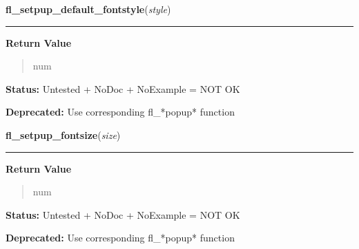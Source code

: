     \label{xformslib:deprecated:fl_setpup_default_fontstyle}

    \vspace{0.5ex}

\hspace{.8\funcindent}\begin{boxedminipage}{\funcwidth}

    \raggedright \textbf{fl\_setpup\_default\_fontstyle}(\textit{style})

    \vspace{-1.5ex}

    \rule{\textwidth}{0.5\fboxrule}
\setlength{\parskip}{2ex}
\setlength{\parskip}{1ex}
      \textbf{Return Value}
    \vspace{-1ex}

      \begin{quote}
      num

      \end{quote}

\textbf{Status:} Untested + NoDoc + NoExample = NOT OK



\textbf{Deprecated:} Use corresponding fl\_*popup* function



    \end{boxedminipage}

    \label{xformslib:deprecated:fl_setpup_default_fontsize}

    \vspace{0.5ex}

\hspace{.8\funcindent}\begin{boxedminipage}{\funcwidth}

    \raggedright \textbf{fl\_setpup\_fontsize}(\textit{size})

    \vspace{-1.5ex}

    \rule{\textwidth}{0.5\fboxrule}
\setlength{\parskip}{2ex}
\setlength{\parskip}{1ex}
      \textbf{Return Value}
    \vspace{-1ex}

      \begin{quote}
      num

      \end{quote}

\textbf{Status:} Untested + NoDoc + NoExample = NOT OK



\textbf{Deprecated:} Use corresponding fl\_*popup* function



    \end{boxedminipage}

